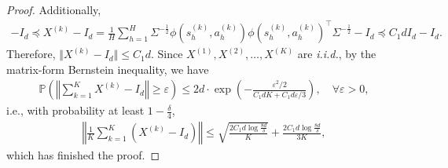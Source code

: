 \documentclass{article}
\numberwithin{equation}{section}
\begin{document}
\begin{proof}
Additionally,
\begin{align*}
	-I_d\preceq X^{(k)}-I_d=\frac{1}{H}\sum_{h=1}^H\Sigma^{-\frac{1}{2}}\phi\left(s^{(k)}_h,a^{(k)}_h\right)\phi\left(s^{(k)}_h,a^{(k)}_h\right)^\top\Sigma^{-\frac{1}{2}}-I_d \preceq C_1dI_d-I_d. 
\end{align*}
Therefore, $\Vert X^{(k)}-I_d\Vert\leq C_1d$. Since $X^{(1)},X^{(2)},\ldots,X^{(K)}$ are \textit{i.i.d.}, by the matrix-form Bernstein inequality, we have
\begin{align*}
	\mathbb{P}\left(\left\Vert\sum_{k=1}^K X^{(k)}-I_d\right\Vert\geq\varepsilon\right)\leq 2d\cdot\exp\left(-\frac{\varepsilon^2/2}{C_1dK+C_1d \varepsilon/3}\right),\quad \forall \varepsilon>0, 
\end{align*}
i.e., with probability at least $1-\frac{\delta}{4}$,
\begin{align*}
    \left\Vert\frac{1}{K}\sum_{k=1}^K\left(X^{(k)}-I_d\right)\right\Vert\leq \sqrt{\frac{2C_1d\log\frac{8d}{\delta}}{K}}+\frac{2C_1d\log\frac{8d}{\delta}}{3K}, 
\end{align*}
which has finished the proof. 
\end{proof}
 
\end{document}
